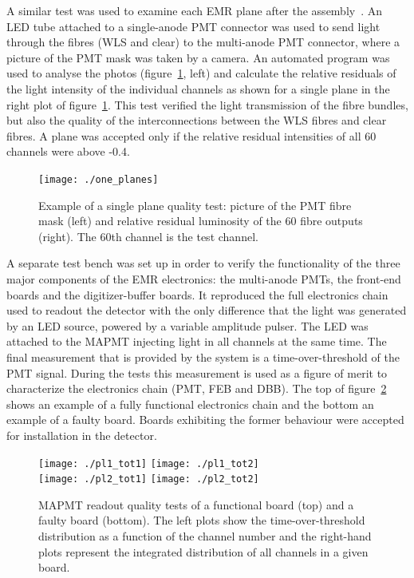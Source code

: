 \documentclass[a4paper,11pt]{article}
\begin{document}
A similar test was used to examine each EMR plane after the assembly~\cite{emr_elquality}. An LED tube attached to a single-anode PMT connector was used to send light through
the fibres (WLS and clear) to the multi-anode PMT connector, where a picture of the PMT mask was taken by a camera. An automated
program was used to analyse the photos (figure~\ref{fig:plane_tests_one_planes}, left) and calculate the relative residuals of the light intensity
of the individual channels as shown for a single plane in the right plot of figure~\ref{fig:plane_tests_one_planes}. This test verified the light transmission of the fibre bundles, but also
the quality of the interconnections between the WLS fibres and clear fibres. A plane was accepted only if the relative residual intensities of all 60
channels were above -0.4.

\begin{figure}[htb]
 \centering
 \texttt{[image: ./one\_planes]}
 \caption[Example of plane quality tests]{Example of a single plane quality test: picture of the PMT fibre mask (left) and relative residual luminosity of the 60 fibre outputs (right). The 60th channel is the test channel.}
 \label{fig:plane_tests_one_planes}
\end{figure}

A separate test bench was set up in order to verify the functionality of the three major components of the EMR electronics: the multi-anode PMTs, the 
front-end boards and the digitizer-buffer boards. It reproduced the full electronics chain used to readout the detector with the only difference that the
light was generated by an LED source, powered by a variable amplitude pulser. The LED was attached to the MAPMT injecting light in all channels at the same time. The
final measurement that is provided by the system is a time-over-threshold of the PMT signal. During the tests this measurement is used as a figure of merit
to characterize the electronics chain (PMT, FEB and DBB). The top of figure~\ref{fig:tot_feb_dbb_test} shows an example of a fully functional electronics chain
and the bottom an example of a faulty board. Boards exhibiting the former behaviour were accepted for
installation in the detector.

\begin{figure}[htb]
 \centering
 \texttt{[image: ./pl1\_tot1]}
 \texttt{[image: ./pl1\_tot2]}\\
 \texttt{[image: ./pl2\_tot1]}
 \texttt{[image: ./pl2\_tot2]}
 \caption[Electronics quality tests]{MAPMT readout quality tests of a functional board (top) and a faulty board (bottom). The left plots show the time-over-threshold
 distribution as a function of the channel number and the right-hand plots represent the integrated distribution of all channels in a given board.}
 \label{fig:tot_feb_dbb_test}
\end{figure}
\end{document}
